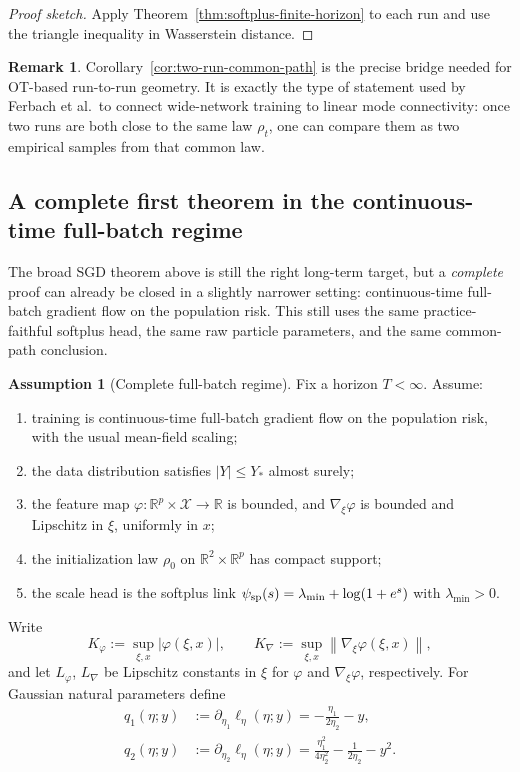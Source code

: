 \documentclass[11pt]{article}
\theoremstyle{definition}
\newtheorem{assumption}[theorem]{Assumption}
\newtheorem{remark}[theorem]{Remark}
\newcommand{\R}{\mathbb{R}}
\newcommand{\norm}[1]{\left\lVert #1 \right\rVert}
\newcommand{\mc}[1]{\mathcal{#1}}
\begin{document}
\begin{proof}[Proof sketch]
Apply Theorem~\ref{thm:softplus-finite-horizon} to each run and use the triangle
inequality in Wasserstein distance.
\end{proof}

\begin{remark}
Corollary~\ref{cor:two-run-common-path} is the precise bridge needed for
OT-based run-to-run geometry. It is exactly the type of statement used by
Ferbach et al.\ to connect wide-network training to linear mode connectivity:
once two runs are both close to the same law $\rho_t$, one can compare them as
two empirical samples from that common law.
\end{remark}

\subsection{A complete first theorem in the continuous-time full-batch regime}

The broad SGD theorem above is still the right long-term target, but a
\emph{complete} proof can already be closed in a slightly narrower setting:
continuous-time full-batch gradient flow on the population risk. This still
uses the same practice-faithful softplus head, the same raw particle
parameters, and the same common-path conclusion.

\begin{assumption}[Complete full-batch regime]
\label{ass:complete-full-batch}
Fix a horizon $T<\infty$. Assume:
\begin{enumerate}[label=(CF\arabic*)]
  \item training is continuous-time full-batch gradient flow on the population
  risk, with the usual mean-field scaling;
  \item the data distribution satisfies $|Y|\le Y_\ast$ almost surely;
  \item the feature map $\varphi:\R^p\times\mc{X}\to\R$ is bounded, and
  $\nabla_\xi \varphi$ is bounded and Lipschitz in $\xi$, uniformly in $x$;
  \item the initialization law $\rho_0$ on $\R^2\times\R^p$ has compact support;
  \item the scale head is the softplus link
  $\psi_{\rm sp}(s)=\lambda_{\min}+\log(1+e^s)$ with $\lambda_{\min}>0$.
\end{enumerate}
\end{assumption}

Write
\[
  K_\varphi:=\sup_{\xi,x}|\varphi(\xi,x)|,
  \qquad
  K_{\nabla}:=\sup_{\xi,x}\norm{\nabla_\xi\varphi(\xi,x)},
\]
and let $L_\varphi$, $L_{\nabla}$ be Lipschitz constants in $\xi$ for
$\varphi$ and $\nabla_\xi\varphi$, respectively. For Gaussian natural
parameters define
\begin{align}
  q_1(\eta;y)
  &:=
  \partial_{\eta_1}\ell_\eta(\eta;y)
  =
  -\frac{\eta_1}{2\eta_2}-y,
  \\
  q_2(\eta;y)
  &:=
  \partial_{\eta_2}\ell_\eta(\eta;y)
  =
  \frac{\eta_1^2}{4\eta_2^2}
  -
  \frac{1}{2\eta_2}
  -
  y^2.
\end{align}
\end{document}
